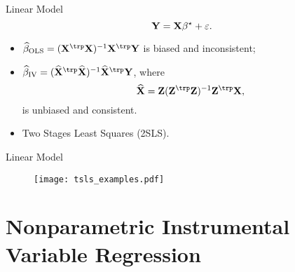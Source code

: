 \documentclass[aspectratio=169]{beamer}
\begin{document}
    \begin{frame}{Linear Model}
        \begin{equation*}
            \mathbf{Y} = \mathbf{X} \beta^{ \star } + \varepsilon
        .\end{equation*}
        \begin{itemize}
            \item<2-> $ \betaols = ( \bX^{ \trp } \bX )^{ -1 } \bX^{ \trp } \bY $ is biased and inconsistent;
            \item<3-> $ \betaiv = ( \hat{ \bX }^{ \trp } \hat{ \bX } )^{ -1 } \hat{ \bX }^{ \trp } \bY $, where
                \begin{equation*}
                    \hat{ \bX } = \bZ ( \bZ^{ \trp } \bZ )^{ -1 } \bZ^{ \trp } \bX
                ,\end{equation*}
                is unbiased and consistent.
            \item<3-> Two Stages Least Squares (2SLS).
        \end{itemize}
    \end{frame}

    \begin{frame}{Linear Model}
        \begin{figure}[htb]
            \begin{center}
                \texttt{[image: tsls\_examples.pdf]}
            \end{center}
        \end{figure}
    \end{frame}

    \section{Nonparametric Instrumental Variable Regression}
\end{document}
